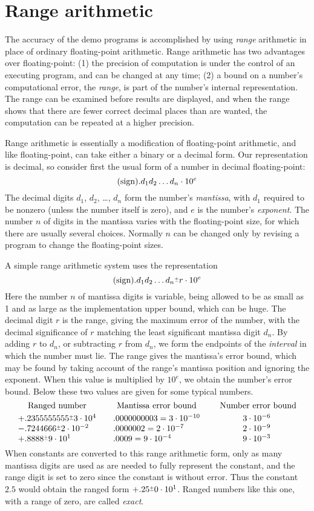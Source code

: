 \section{Range arithmetic}
The accuracy of the demo programs is accomplished by using {\sl range}
arithmetic in place of ordinary
floating-point arithmetic. Range arithmetic
has two advantages over floating-point: (1) the precision
of computation is under the control
of an executing program, and can be changed at any time;
(2) a bound on a number's computational error, the {\sl range}, 
is part of the number's internal representation. The range can
be examined before results are displayed, and when the range shows
that there are fewer correct decimal places than are wanted,
the computation can be repeated at a higher precision.

Range arithmetic is essentially a modification of floating-point
arithmetic, and like floating-point, can take either
a binary or a decimal form. Our representation is decimal, so
consider first the usual form of a number in decimal floating-point:
$$ \hbox{(sign)} .d_1d_2\dots d_n \cdot 10^e$$
The decimal digits $d_1$, $d_2$, \dots, $d_n$ form the number's
{\sl mantissa}, with $d_1$ required to be nonzero (unless the
number itself is zero), and $e$ is the
number's {\sl exponent}. The number $n$ of digits in the mantissa
varies with the floating-point size, for which there are usually
several choices.
Normally $n$ can be changed only by revising a program to change 
the floating-point sizes.

A simple range arithmetic system uses the representation
$$ \hbox{(sign)} .d_1d_2\dots d_n \pms r\cdot 10^e$$
Here the number $n$ of mantissa digits is variable, being allowed to
be as small as 1 and as large as the implementation upper bound, which can
be huge.
The decimal digit $r$ is the range, giving
the maximum error of the number, with the decimal significance of $r$ 
matching the least significant mantissa digit $d_n$. By
adding $r$ to $d_n$, or subtracting $r$ from $d_n$, we form the endpoints
of the {\sl interval} in which the number must lie.
The range gives the mantissa's error bound, which may be found
by taking account of the range's mantissa position and ignoring the exponent.
When this value is multiplied by $10^e$, we obtain the number's error bound.
Below these two values are given for some typical numbers.
$$\vbox{\halign{$#$\hfil&\qquad$#$\hfil&\qquad\hfil$#$\hfil\cr
\hfill\hbox{Ranged number}\hfill&\hfill\hbox{Mantissa error bound}\hfill
&\hbox{\ Number error bound}\cr
\noalign{\smallskip}
+.2355555555\pms3\cdot10^4& .0000000003=3\cdot10^{-10}&3\cdot10^{-6}\cr
-.7244666\pms2\cdot10^{-2}&.0000002=2\cdot10^{-7}&2\cdot10^{-9}\cr
+.8888\pms9\cdot10^1&.0009=9\cdot10^{-4}&9\cdot10^{-3}\cr}}$$
When constants are converted to this range arithmetic
form, only as many mantissa digits are used as are needed to fully
represent the constant, and the range digit is set to zero since
the constant is without error. Thus the constant $2.5$ would obtain the
ranged form
$+.25\pms0\cdot 10^1$. Ranged numbers like this one, with a
range of zero, are called {\sl exact}.

